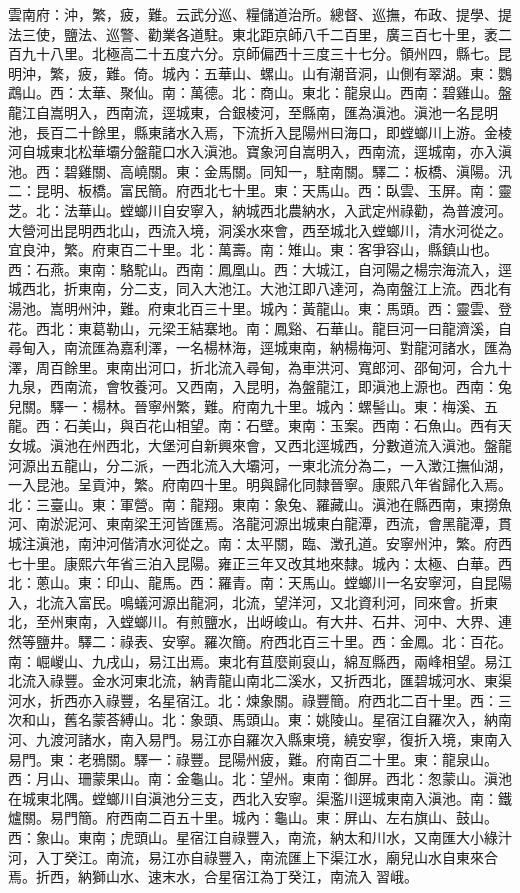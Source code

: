 \begin{pinyinscope}
雲南府：沖，繁，疲，難。云武分巡、糧儲道治所。總督、巡撫，布政、提學、提法三使，鹽法、巡警、勸業各道駐。東北距京師八千二百里，廣三百七十里，袤二百九十八里。北極高二十五度六分。京師偏西十三度三十七分。領州四，縣七。昆明沖，繁，疲，難。倚。城內：五華山、螺山。山有潮音洞，山側有翠湖。東：鸚鵡山。西：太華、聚仙。南：萬德。北：商山。東北：龍泉山。西南：碧雞山。盤龍江自嵩明入，西南流，逕城東，合銀棱河，至縣南，匯為滇池。滇池一名昆明池，長百二十餘里，縣東諸水入焉，下流折入昆陽州曰海口，即螳螂川上游。金棱河自城東北松華壩分盤龍口水入滇池。寶象河自嵩明入，西南流，逕城南，亦入滇池。西：碧雞關、高嶢關。東：金馬關。同知一，駐南關。驛二：板橋、滇陽。汛二：昆明、板橋。富民簡。府西北七十里。東：天馬山。西：臥雲、玉屏。南：靈芝。北：法華山。螳螂川自安寧入，納城西北農納水，入武定州祿勸，為普渡河。大營河出昆明西北山，西流入境，洞溪水來會，西至城北入螳螂川，清水河從之。宜良沖，繁。府東百二十里。北：萬壽。南：雉山。東：客爭容山，縣鎮山也。西：石燕。東南：駱駝山。西南：鳳凰山。西：大城江，自河陽之楊宗海流入，逕城西北，折東南，分二支，同入大池江。大池江即八達河，為南盤江上流。西北有湯池。嵩明州沖，難。府東北百三十里。城內：黃龍山。東：馬頭。西：靈雲、登花。西北：東葛勒山，元梁王結寨地。南：鳳谿、石華山。龍巨河一曰龍濟溪，自尋甸入，南流匯為嘉利澤，一名楊林海，逕城東南，納楊梅河、對龍河諸水，匯為澤，周百餘里。東南出河口，折北流入尋甸，為車洪河、寬郎河、邵甸河，合九十九泉，西南流，會牧養河。又西南，入昆明，為盤龍江，即滇池上源也。西南：兔兒關。驛一：楊林。晉寧州繁，難。府南九十里。城內：螺髻山。東：梅溪、五龍。西：石美山，與百花山相望。南：石壁。東南：玉案。西南：石魚山。西有天女城。滇池在州西北，大堡河自新興來會，又西北逕城西，分數道流入滇池。盤龍河源出五龍山，分二派，一西北流入大壩河，一東北流分為二，一入澂江撫仙湖，一入昆池。呈貢沖，繁。府南四十里。明與歸化同隸晉寧。康熙八年省歸化入焉。北：三臺山。東：軍營。南：龍翔。東南：象兔、羅藏山。滇池在縣西南，東撈魚河、南淤泥河、東南梁王河皆匯焉。洛龍河源出城東白龍潭，西流，會黑龍潭，貫城注滇池，南沖河偕清水河從之。南：太平關，臨、澂孔道。安寧州沖，繁。府西七十里。康熙六年省三泊入昆陽。雍正三年又改其地來隸。城內：太極、白華。西北：蔥山。東：印山、龍馬。西：羅青。南：天馬山。螳螂川一名安寧河，自昆陽入，北流入富民。鳴蟻河源出龍洞，北流，望洋河，又北資利河，同來會。折東北，至州東南，入螳螂川。有煎鹽水，出岈峻山。有大井、石井、河中、大界、連然等鹽井。驛二：祿表、安寧。羅次簡。府西北百三十里。西：金鳳。北：百花。南：崛嵕山、九戌山，易江出焉。東北有苴麼崱裒山，綿亙縣西，兩峰相望。易江北流入祿豐。金水河東北流，納青龍山南北二溪水，又折西北，匯碧城河水、東渠河水，折西亦入祿豐，名星宿江。北：煉象關。祿豐簡。府西北二百十里。西：三次和山，舊名蒙荅縛山。北：象頭、馬頭山。東：姚陵山。星宿江自羅次入，納南河、九渡河諸水，南入易門。易江亦自羅次入縣東境，繞安寧，復折入境，東南入易門。東：老鴉關。驛一：祿豐。昆陽州疲，難。府南百二十里。東：龍泉山。西：月山、珊蒙果山。南：金龜山。北：望州。東南：御屏。西北：怱蒙山。滇池在城東北隅。螳螂川自滇池分三支，西北入安寧。渠濫川逕城東南入滇池。南：鐵爐關。易門簡。府西南二百五十里。城內：龜山。東：屏山、左右旗山、鼓山。西：象山。東南；虎頭山。星宿江自祿豐入，南流，納太和川水，又南匯大小綠汁河，入丁癸江。南流，易江亦自祿豐入，南流匯上下渠江水，廟兒山水自東來合焉。折西，納獅山水、速末水，合星宿江為丁癸江，南流入習峨。


\end{pinyinscope}
